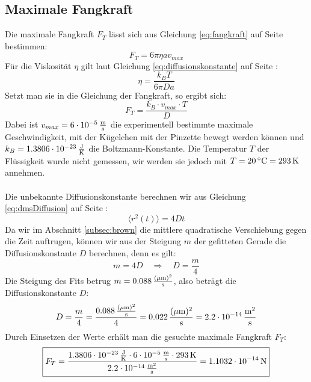 \documentclass[a4paper,titlepage]{scrartcl}
\numberwithin{equation}{section}
\begin{document}
\subsection{Maximale Fangkraft}
Die maximale Fangkraft $F_T$ lässt sich aus Gleichung \ref{eq:fangkraft} auf Seite \pageref{eq:fangkraft} bestimmen:
\begin{equation*}
F_T=6 \pi \eta a v_{max}
\end{equation*}
Für die Viskosität $\eta$ gilt laut Gleichung \ref{eq:diffusionskonstante} auf Seite \pageref{eq:diffusionskonstante}:
\begin{equation*}
\eta=\frac{k_B T}{6 \pi D a}
\end{equation*}
Setzt man sie in die Gleichung der Fangkraft, so ergibt sich:
\begin{equation*}
F_T=\frac{k_B \cdot v_{max} \cdot T}{D}
\end{equation*}
Dabei ist $v_{max}=\unit[6 \cdot 10^{-5}]{\frac{m}{s}}$ die experimentell bestimmte maximale Geschwindigkeit, mit der Kügelchen mit der Pinzette bewegt werden können und $k_B=\unit[1.3806 \cdot 10^{-23}]{\frac{J}{K}}$ die Boltzmann-Konstante. Die Temperatur $T$ der Flüssigkeit wurde nicht gemessen, wir werden sie jedoch mit $T=\unit[20]{^\circ C}=\unit[293]{K}$ annehmen.\\ \\
Die unbekannte Diffusionskonstante berechnen wir aus Gleichung \ref{eq:dmsDiffusion} auf Seite \pageref{eq:dmsDiffusion}:
\begin{equation*}
\langle r^2(t) \rangle=4Dt
\end{equation*}
Da wir im Abschnitt \ref{subsec:brown} die mittlere quadratische Verschiebung gegen die Zeit auftrugen, können wir aus der Steigung $m$ der gefitteten Gerade die Diffusionskonstante $D$ berechnen, denn es gilt:
\begin{equation*}
m=4D \quad \Rightarrow \quad D=\frac{m}{4}
\end{equation*}
Die Steigung des Fits betrug $m=\unit[0.088]{\frac{(\mu m)^2}{s}}$, also beträgt die Diffusionskonstante $D$:
\begin{equation*}
D=\frac{m}{4}=\frac{\unit[0.088]{\frac{(\mu m)^2}{s}}}{4}=\unit[0.022]{\frac{(\mu m)^2}{s}}=\unit[2.2 \cdot 10^{-14}]{\frac{m^2}{s}}
\end{equation*}
Durch Einsetzen der Werte erhält man die gesuchte maximale Fangkraft $F_T$:
\begin{equation}
\boxed{F_T=\frac{\unit[1.3806 \cdot 10^{-23}]{\frac{J}{K}} \cdot \unit[6 \cdot 10^{-5}]{\frac{m}{s}} \cdot \unit[293]{K}}{\unit[2.2 \cdot 10^{-14}]{\frac{m^2}{s}}}=\unit[1.1032 \cdot 10^{-14}]{N}}
\end{equation}
\end{document}
